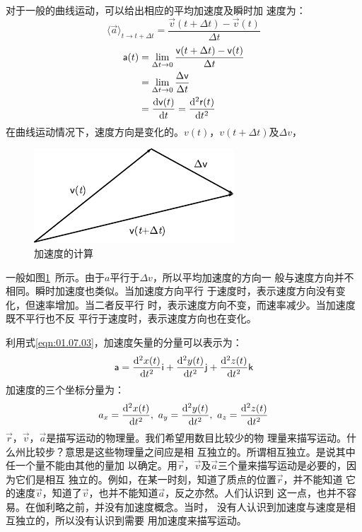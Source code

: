 对于一般的曲线运动，可以给出相应的平均加速度及瞬时加
速度为：
\begin{equation}\label{eqn:01.08.02}
    \langle \vec{a} \rangle_{t \rightarrow t+\Delta t} = \frac{\vec{v}(t+\Delta t)-\vec{v}(t)}{\Delta t}
\end{equation}
\begin{equation}\label{eqn:01.08.03}
    \begin{aligned}
        {\mathsf{a}}(t) & =\lim _{\Delta t \rightarrow 0} \frac{{\mathsf{v}}(t+\Delta t)-{\mathsf{v}}(t)}{\Delta t} \\
                  & =\lim_{\Delta t \rightarrow 0}\frac{\Delta {\mathsf{v}}}{\Delta t}                  \\
                  & =\frac{{\rm d}{\mathsf{v}}(t)}{{\rm d} t}=\frac{{\rm d}^2 {\mathsf{r}}(t)}{{\rm d} t^2}
    \end{aligned}
\end{equation}
在曲线运动情况下，速度方向是变化的。$v(t)$，$v(t+\Delta t)$及$\Delta v$，
\begin{figure}
    \centering
    \small
    \includegraphics{figure/fig01.14}
    \caption{加速度的计算}
    \label{fig:01.14}
\end{figure}
一般如图\ref{fig:01.14}~所示。由于$a$平行于$\Delta v$，所以平均加速度的方向一
般与速度方向并不相同。瞬时加速度也类似。当加速度方向平行
于速度时，表示速度方向没有变化，但速率增加。当二者反平行
时，表示速度方向不变，而速率减少。当加速度既不平行也不反
平行于速度时，表示速度方向也在变化。

利用式\eqref{eqn:01.07.03}，加速度矢量的分量可以表示为：
\begin{equation}\label{eqn:01.08.04}
    {\mathsf{a}}=\frac{{\rm d}^2x(t)}{{\rm d} t^2}{\mathsf{i}}+\frac{{\rm d}^2y(t)}{{\rm d} t^2}{\mathsf{j}}+\frac{{\rm d}^2z(t)}{{\rm d} t^2}{\mathsf{k}}
\end{equation}
加速度的三个坐标分量为：
\begin{equation}\label{eqn:01.08.05}
    a_x=\frac{{\rm d}^2x(t)}{{\rm d} t^2},~ a_y=\frac{{\rm d}^2y(t)}{{\rm d} t^2},~
    a_z=\frac{{\rm d}^2z(t)}{{\rm d} t^2}
\end{equation}
$\vec{r}$，$\vec{v}$，$\vec{a}$是描写运动的物理量。我们希望用数目比较少的物
理量来描写运动。什么州比较步？意思是这些物理量之间应是相
互独立的。所谓相互独立。是说其中任一个量不能由其他的量加
以确定。用$\vec{r}$，$\vec{v}$及$\vec{a}$三个量来描写运动是必要的，因为它们是相互
独立的。例如，在某一时刻，知道了质点的位置$\vec{r}$，并不能知道
它的速度$\vec{v}$，知道了$\vec{v}$，也并不能知道$\vec{a}$，反之亦然。人们认识到
这一点，也并不容易。在伽利略之前，并没有加速度概念。当时，
没有人认识到加速度与速度是相互独立的，所以没有认识到需要
用加速度来描写运动。

